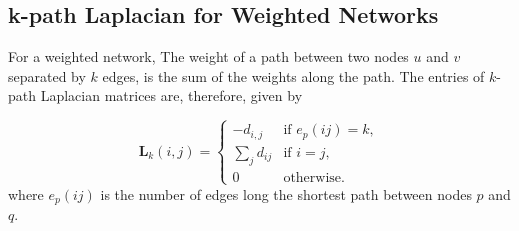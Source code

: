 \documentclass[10pt,a4paper]{article}
\begin{document}
    	    \subsection{k-path Laplacian for Weighted Networks}
    	    For a weighted network, The weight of a path between two nodes $u$ and $v$ separated by $k$ edges, is the sum of the weights along the path. The entries of $k$-path Laplacian matrices are, therefore, given by
    	    
    	    \begin{equation}
    	    \mathbf{L}_k(i,j) = \begin{cases} -d_{i,j} &\mbox{if } e_p(ij) = k, \\
    	    \sum_{j} d_{ij} &\mbox{if } i = j , \\
    	    0 & \text{otherwise}.
    	    \end{cases}
    	    \end{equation}
    	    where $e_p(ij)$ is the number of edges long the shortest path between nodes $p$ and $q$.\\
    	    
\end{document}
